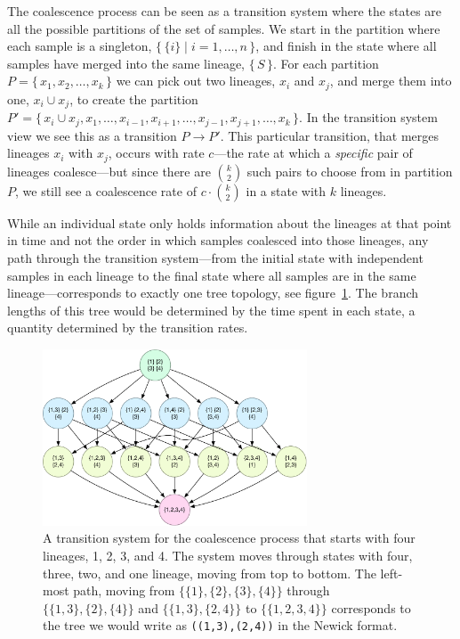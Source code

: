 The coalescence process can be seen as a transition system where the states are all the possible partitions of the set of samples. We start in the partition where each sample is a singleton, $\{\,\{i\}\;|\;i=1,\ldots,n\,\}$, and finish in the state where all samples have merged into the same lineage, $\{\,S\,\}$. For each partition $P=\{\,x_1,x_2,\ldots,x_k\,\}$ we can pick out two lineages, $x_i$ and $x_j$, and merge them into one, $x_i\cup x_j$, to create the partition $P'=\{\,x_i\cup x_j,x_1,\ldots,x_{i-1},x_{i+1},\ldots,x_{j-1},x_{j+1},\ldots,x_k\,\}$. In the transition system view we see this as a transition $P\to P'$. This particular transition, that merges lineages $x_i$ with $x_j$, occurs with rate $c$---the rate at which a \emph{specific} pair of lineages coalesce---but since there are $k \choose 2$ such pairs to choose from in partition $P$, we still see a coalescence rate of $c\cdot{k \choose 2}$ in a state with $k$ lineages.

While an individual state only holds information about the lineages at that point in time and not the order in which samples coalesced into those lineages, any path through the transition system---from the initial state with independent samples in each lineage to the final state where all samples are in the same lineage---corresponds to exactly one tree topology, see figure~\ref{fig:coal-no-recomb-transition-system}. The branch lengths of this tree would be determined by the time spent in each state, a quantity determined by the transition rates.

\begin{figure}[tb]
    \centering\includegraphics[width=0.7\textwidth]{Chapters/Sequential-coalescent-figures/Transition-system-single-locus}
  \caption{A transition system for the coalescence process that starts with four lineages, 1, 2, 3, and 4. The system moves through states with four, three, two, and one lineage, moving from top to bottom. The left-most path, moving from $\{\{1\},\{2\},\{3\},\{4\}\}$ through $\{\{1,3\},\{2\},\{4\}\}$ and $\{\{1,3\},\{2,4\}\}$ to $\{\{1,2,3,4\}\}$ corresponds to the tree we would write as \texttt{((1,3),(2,4))} in the Newick format.}
  \label{fig:coal-no-recomb-transition-system}
\end{figure}



